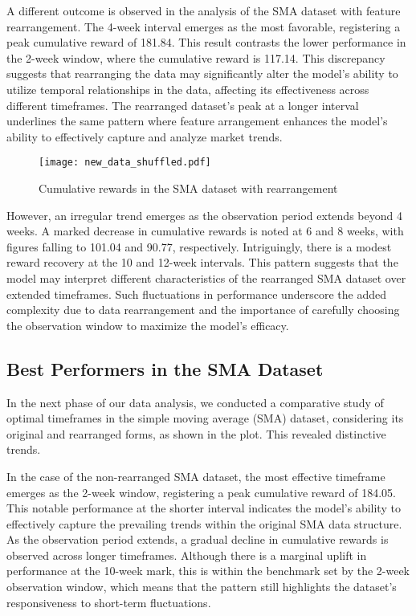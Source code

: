 A different outcome is observed in the analysis of the SMA dataset with feature rearrangement. The 4-week interval emerges as the most favorable, registering a peak cumulative reward of 181.84. This result contrasts the lower performance in the 2-week window, where the cumulative reward is 117.14. This discrepancy suggests that rearranging the data may significantly alter the model's ability to utilize temporal relationships in the data, affecting its effectiveness across different timeframes. The rearranged dataset's peak at a longer interval underlines the same pattern where feature arrangement enhances the model's ability to effectively capture and analyze market trends.

\begin{figure}[ht]
    \centering
    \texttt{[image: new\_data\_shuffled.pdf]}
    \caption{Cumulative rewards in the SMA dataset with rearrangement }
    \label{fig:new_data_no_suhffle}
\end{figure}

However, an irregular trend emerges as the observation period extends beyond 4 weeks. A marked decrease in cumulative rewards is noted at 6 and 8 weeks, with figures falling to 101.04 and 90.77, respectively. Intriguingly, there is a modest reward recovery at the 10 and 12-week intervals. This pattern suggests that the model may interpret different characteristics of the rearranged SMA dataset over extended timeframes. Such fluctuations in performance underscore the added complexity due to data rearrangement and the importance of carefully choosing the observation window to maximize the model's efficacy. 

\subsection{Best Performers in the SMA Dataset}
In the next phase of our data analysis, we conducted a comparative study of optimal timeframes in the simple moving average (SMA) dataset, considering its original and rearranged forms, as shown in the plot. This revealed distinctive trends. 

In the case of the non-rearranged SMA dataset, the most effective timeframe emerges as the 2-week window, registering a peak cumulative reward of 184.05. This notable performance at the shorter interval indicates the model's ability to effectively capture the prevailing trends within the original SMA data structure. As the observation period extends, a gradual decline in cumulative rewards is observed across longer timeframes. Although there is a marginal uplift in performance at the 10-week mark, this is within the benchmark set by the 2-week observation window, which means that the pattern still highlights the dataset's responsiveness to short-term fluctuations.


